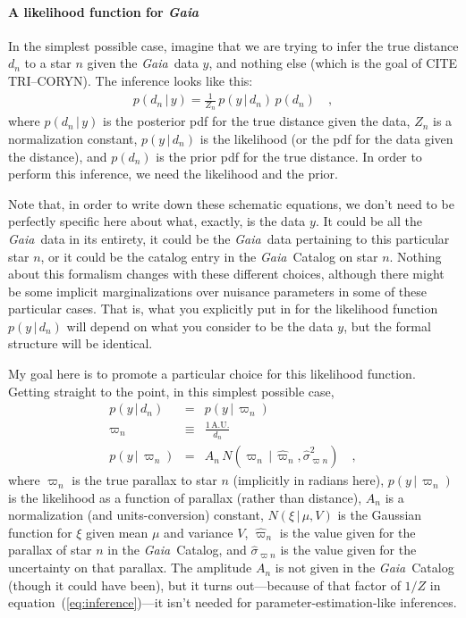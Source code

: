 \documentclass[12pt]{article}
\newcommand{\Gaia}{\textsl{Gaia}}
\newcommand{\equationname}{equation}
\newcommand{\AU}{\mathrm{A.U.}}
\newcommand{\given}{\,|\,}
\begin{document}
\paragraph{A likelihood function for \Gaia}
In the simplest possible case, imagine that we are trying to infer
the true distance $d_n$ to a star $n$ given the \Gaia\ data $y$, and nothing else
(which is the goal of CITE TRI--CORYN).
The inference looks like this:
\begin{eqnarray}
p(d_n\given y) = \frac{1}{Z_n}\,p(y\given d_n)\,p(d_n)
\label{eq:inference}
\quad ,
\end{eqnarray}
where
$p(d_n\given y)$ is the posterior pdf for the true distance given the data,
$Z_n$ is a normalization constant,
$p(y\given d_n)$ is the likelihood (or the pdf for the data given the distance),
and $p(d_n)$ is the prior pdf for the true distance.
In order to perform this inference, we need the likelihood and the prior.

Note that, in order to write down these schematic equations,
we don't need to be perfectly specific here about what, exactly,
is the data $y$.
It could be all the \Gaia\ data in its entirety,
it could be the \Gaia\ data pertaining to this particular star $n$,
or it could be the catalog entry in the \Gaia\ Catalog on star $n$.
Nothing about this formalism changes with these different choices,
although there might be some implicit marginalizations over nuisance
parameters in some of these particular cases.
That is, what you explicitly put in for the likelihood function $p(y\given d_n)$
will depend on what you consider to be the data $y$, but the formal structure
will be identical.

My goal here is to promote a particular choice for this likelihood function.
Getting straight to the point, in this simplest possible case, 
\begin{eqnarray}
p(y\given d_n) &=& p(y\given\varpi_n)
\label{eq:gotoparallax}
\\
\varpi_n &\equiv& \frac{1\,\AU}{d_n}
\\
p(y\given\varpi_n) &=& A_n\,N(\varpi_n\given\hat{\varpi}_n,\hat{\sigma}^2_{\varpi n})
\label{eq:onedlike}
\quad ,
\end{eqnarray}
where
$\varpi_n$ is the true parallax to star $n$ (implicitly in radians here),
$p(y\given\varpi_n)$ is the likelihood as a function of parallax (rather than distance),
$A_n$ is a normalization (and units-conversion) constant,
$N(\xi\given\mu,V)$ is the Gaussian function for $\xi$ given mean $\mu$ and variance $V$,
$\hat{\varpi}_n$ is the value given for the parallax of star $n$ in the \Gaia\ Catalog,
and $\hat{\sigma}_{\varpi n}$ is the value given for the uncertainty on that parallax.
The amplitude $A_n$ is not given in the \Gaia\ Catalog (though it could have been),
but it turns out---because of that factor of $1/Z$ in
\equationname~(\ref{eq:inference})---it isn't needed for parameter-estimation-like
inferences.
\end{document}

